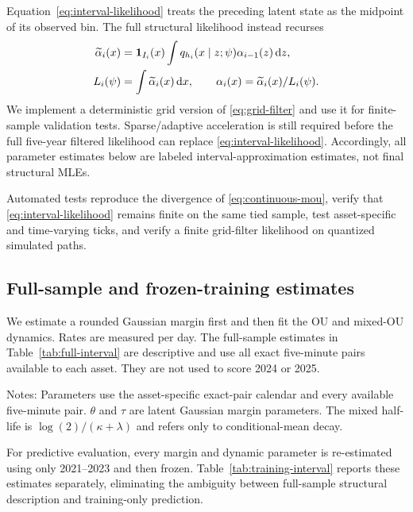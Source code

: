 Equation~\eqref{eq:interval-likelihood} treats the preceding latent state as
the midpoint of its observed bin.  The full structural likelihood instead
recurses
\begin{align}
 \widetilde\alpha_i(x)
 &=\mathbf 1_{I_i}(x)\int q_{h_i}(x\mid z;\psi)
                 \alpha_{i-1}(z)\,\mathrm d z,\\
 L_i(\psi)&=\int\widetilde\alpha_i(x)\,\mathrm d x,
 \qquad \alpha_i(x)=\widetilde\alpha_i(x)/L_i(\psi).       \label{eq:grid-filter}
\end{align}
We implement a deterministic grid version of \eqref{eq:grid-filter} and use it
for finite-sample validation tests.  Sparse/adaptive acceleration is still
required before the full five-year filtered likelihood can replace
\eqref{eq:interval-likelihood}.  Accordingly, all parameter estimates below
are labeled interval-approximation estimates, not final structural MLEs.

Automated tests reproduce the divergence of
\eqref{eq:continuous-mou}, verify that \eqref{eq:interval-likelihood} remains
finite on the same tied sample, test asset-specific and time-varying ticks,
and verify a finite grid-filter likelihood on quantized simulated paths.

\subsection{Full-sample and frozen-training estimates}

We estimate a rounded Gaussian margin first and then fit the OU and mixed-OU
dynamics.  Rates are measured per day.  The full-sample estimates in
Table~\ref{tab:full-interval} are descriptive and use all exact five-minute
pairs available to each asset.  They are not used to score 2024 or 2025.

\begin{table}[t]
\centering
\caption{Full-sample interval-likelihood estimates, 2021--2025}
\label{tab:full-interval}

\begin{minipage}{0.94\textwidth}
\footnotesize
Notes: Parameters use the asset-specific exact-pair calendar and every
available five-minute pair.  $\theta$ and $\tau$ are latent Gaussian margin
parameters.  The mixed half-life is $\log(2)/(\kappa+\lambda)$ and refers only
to conditional-mean decay.
\end{minipage}
\end{table}

For predictive evaluation, every margin and dynamic parameter is re-estimated
using only 2021--2023 and then frozen.  Table~\ref{tab:training-interval}
reports these estimates separately, eliminating the ambiguity between
full-sample structural description and training-only prediction.

